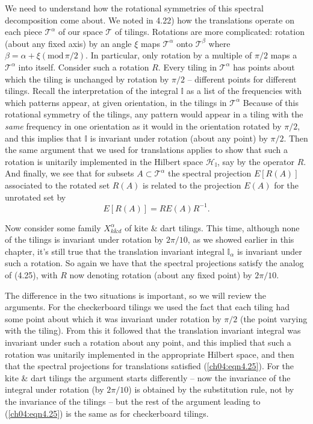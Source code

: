 \documentclass[reqno]{stml-l}
\theoremstyle{plain}
\theoremstyle{definition}
\numberwithin{equation}{chapter}
\begin{document}
We need to understand how the rotational symmetries of this spectral decomposition come about. We noted in 4.22) how the translations operate on each piece $\mathcal{T}^{\alpha}$ of our space $\mathcal{T}$ of tilings. Rotations are more complicated: rotation (about any fixed axis) by an angle $\xi$ maps $\mathcal{T}^{\alpha}$ onto $\mathcal{T}^{\beta}$ where $\beta=\alpha+\xi (\mathrm{mod}\,\pi/2)$. In particular, only rotation by a multiple of $\pi/2$ maps a $\mathcal{T}^{\alpha}$ into itself. Consider such a rotation $R$. Every tiling in $\mathcal{T}^{\alpha}$ has points about which the tiling is unchanged by rotation by $\pi/2$ -- different points for different tilings. Recall the interpretation of the integral $\mathbb{I}$ as a list of the frequencies with which patterns appear, at given orientation, in the tilings in $\mathcal{T}^{\alpha}$ Because of this rotational symmetry of the tilings, any pattern would appear in a tiling with the \emph{same} frequency in one orientation as it would in the orientation rotated by $\pi/2$, and this implies that $\mathbb{I}$ is invariant under rotation (about any point) by $\pi/2$. Then the same argument that we used for translations applies to show that such a rotation is unitarily implemented in the Hilbert space $\mathcal{H}_{\mathbb{I}}$, say by the operator $R$. And finally, we see that for subsets $A\subset \mathcal{T}^{\alpha}$ the spectral projection $E[R(A)]$ associated to the rotated set $R(A)$ is related to the projection $E(A)$ for the unrotated set by
\begin{equation}\label{ch04:eqn4.25}
E[R(A)]=RE(A)R^{-1}.
\end{equation}

Now consider some family $X_{k\& d}^{\alpha}$ of kite \& dart tilings. This time, although none of the tilings is invariant under rotation by $2\pi/10$, as we showed earlier in this chapter, it's still true that the translation
invariant integral $\mathbb{I}_{\alpha}$ is invariant under such a rotation. So again we have that the spectral projections satisfy the analog of (4.25), with $R$ now denoting rotation (about any fixed point) by $2\pi/10$.

The difference in the two situations is important, so we will review the arguments. For the checkerboard tilings we used the fact that each tiling had some point about which it was invariant under rotation by $\pi/2$ (the point varying with the tiling). From this it followed that the translation invariant integral was invariant under such a rotation about any point, and this implied that such a rotation was unitarily implemented in the appropriate Hilbert space, and then that the spectral projections for translations satisfied (\ref{ch04:eqn4.25}). For the kite \& dart tilings the argument starts differently -- now the invariance of the integral under rotation (by $2\pi/10$) is obtained by the substitution rule, not by the invariance of the tilings -- but the rest of the argument leading to (\ref{ch04:eqn4.25}) is the same as for checkerboard tilings.
\end{document}
